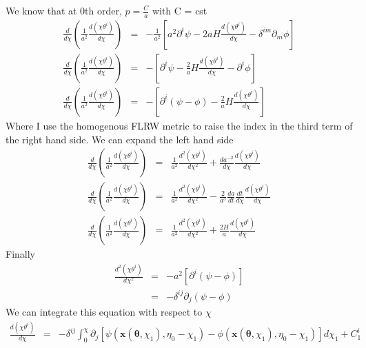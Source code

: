 \documentclass[a4paper, 11pt]{article}
\def\ba{\begin{eqnarray}}
\def\ea{\end{eqnarray}}
\begin{document}
We know that at 0th order, $p = \frac{C}{a}$ with C = cst
\ba
\frac{d}{d\chi} \left( \frac{1}{a^{2}}\frac{d(\chi \theta^{i}) }{d\chi} \right) &=& -\frac{1}{a^{2}} \left[ a^{2}  \partial^{i} \psi - 2 a H \frac{d(\chi \theta^{i}) }{d\chi}   -\delta^{im}\partial_{m} \phi  \right]  \nonumber \\
\frac{d}{d\chi} \left( \frac{1}{a^{2}}\frac{d(\chi \theta^{i}) }{d\chi} \right) &=& -\left[  \partial^{i} \psi - \frac{2}{a}  H \frac{d(\chi \theta^{i}) }{d\chi}   -\partial^{i} \phi  \right] \nonumber \\
\frac{d}{d\chi} \left( \frac{1}{a^{2}}\frac{d(\chi \theta^{i}) }{d\chi} \right) &=& -\left[  \partial^{i} (\psi -\phi) - \frac{2}{a}  H \frac{d(\chi \theta^{i}) }{d\chi}     \right] 
\ea
Where I use the homogenous FLRW metric to raise the index in the third term of the right hand side.
We can expand the left hand side
\ba
\frac{d}{d\chi} \left( \frac{1}{a^{2}}\frac{d(\chi \theta^{i}) }{d\chi} \right)  &=& \frac{1}{a^{2}} \frac{d^{2}(\chi \theta^{i}) }{d\chi^{2}} +\frac{d a^{-2}}{d\chi}  \frac{d(\chi \theta^{i}) }{d\chi} \nonumber \\
\frac{d}{d\chi} \left( \frac{1}{a^{2}}\frac{d(\chi \theta^{i}) }{d\chi} \right)  &=& \frac{1}{a^{2}} \frac{d^{2}(\chi \theta^{i}) }{d\chi^{2}}  - \frac{2}{a^{3}}  \frac{d a}{dt}\frac{dt}{d\chi}  \frac{d(\chi \theta^{i}) }{d\chi} \nonumber \\
\frac{d}{d\chi} \left( \frac{1}{a^{2}}\frac{d(\chi \theta^{i}) }{d\chi} \right)  &=& \frac{1}{a^{2}} \frac{d^{2}(\chi \theta^{i}) }{d\chi^{2}}  +\frac{2 H}{a}    \frac{d(\chi \theta^{i}) }{d\chi} 
\ea
Finally
\ba
 \frac{d^{2}(\chi \theta^{i}) }{d\chi^{2}}   &=&  -a^{2} \left[  \partial^{i} (\psi -\phi)  \right] \\
 &=& - \delta^{ij} \partial_{j} (\psi -\phi)
\ea
We can integrate this equation with respect to $\chi$
\ba
 \frac{d(\chi \theta^{i}) }{d\chi} &=&  - \delta^{ij} \int^{\chi}_{0} \partial_{j} [\psi(\bm{x}(\bm{\theta}, \chi_{1}), \eta_{0}-\chi_{1}) -\phi(\bm{x}(\bm{\theta}, \chi_{1}), \eta_{0}-\chi_{1})]  d\chi_{1} + C^{i}_{1} \\
\ea
\end{document}
